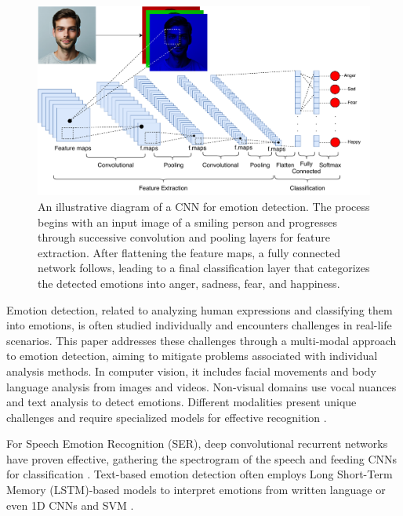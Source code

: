 \documentclass[runningheads]{llncs}
\begin{document}
\begin{figure}[htb]
\centering
\includegraphics[width=0.97\linewidth]{CNNArchitecture.pdf}
\caption{An illustrative diagram of a CNN for emotion detection. The process begins with an input image of a smiling person and progresses through successive convolution and pooling layers for feature extraction. After flattening the feature maps, a fully connected network follows, leading to a final classification layer that categorizes the detected emotions into anger, sadness, fear, and happiness.}
\label{fig:cnnarchitecture}
\end{figure}

Emotion detection, related to analyzing human expressions and classifying them into emotions, is often studied individually and encounters challenges in real-life scenarios. This paper addresses these challenges through a multi-modal approach to emotion detection, aiming to mitigate problems associated with individual analysis methods. In computer vision, it includes facial movements and body language analysis from images and videos. Non-visual domains use vocal nuances and text analysis to detect emotions. Different modalities present unique challenges and require specialized models for effective recognition \cite{Chul2018, Trigeorgis2016, Karna2020}.

For Speech Emotion Recognition (SER), deep convolutional recurrent networks have proven effective, gathering the spectrogram of the speech and feeding CNNs for classification \cite{Badshah2017}. Text-based emotion detection often employs Long Short-Term Memory (LSTM)-based models to interpret emotions from written language \cite{Trigeorgis2016, Karna2020} or even 1D CNNs and SVM \cite{hung_beyond_2023}.
\end{document}
